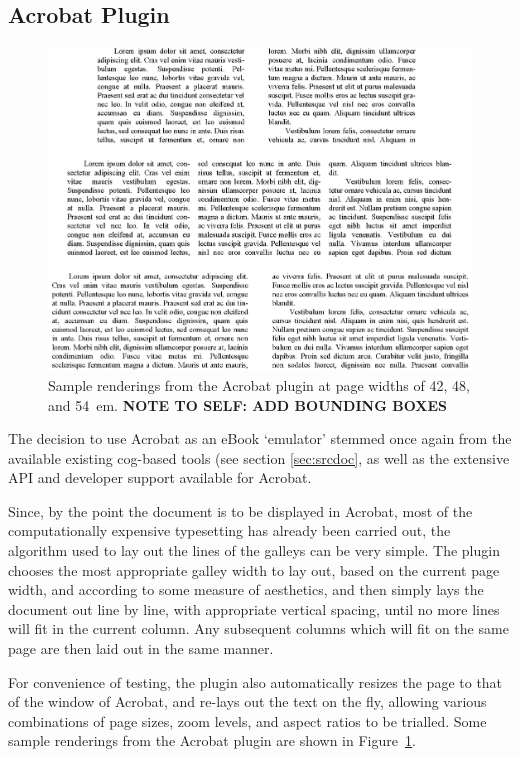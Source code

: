 \subsection{Acrobat Plugin}\label{sec:acroplugin}
\begin{figure}
 \includegraphics[width=\textwidth]{gfx/renderings}
 \caption[Sample renderings from the Acrobat plugin]{Sample renderings from the Acrobat plugin at page widths of 42, 48, and 54~em. \textbf{NOTE TO SELF: ADD BOUNDING BOXES}}
 \label{fig:renderings}
\end{figure}

The decision to use Acrobat as an eBook `emulator' stemmed once again from the available existing \gls{cog}-based tools (see section \ref{sec:srcdoc}, as well as the extensive API and developer support available for Acrobat.

Since, by the point the document is to be displayed in Acrobat, most of the computationally expensive typesetting has already been carried out, the algorithm used to lay out the lines of the galleys can be very simple. The plugin chooses the most appropriate galley width to lay out, based on the current page width, and according to some measure of aesthetics, and then simply lays the document out line by line, with appropriate vertical spacing, until no more lines will fit in the current column. Any subsequent columns which will fit on the same page are then laid out in the same manner.

For convenience of testing, the plugin also automatically resizes the page to that of the window of Acrobat, and re-lays out the text on the fly, allowing various combinations of page sizes, zoom levels, and aspect ratios to be trialled.
Some sample renderings from the Acrobat plugin are shown in Figure~\ref{fig:renderings}.

